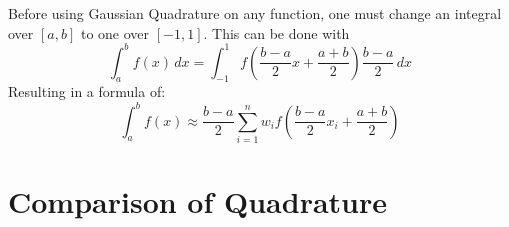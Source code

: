 \documentclass[12pt]{article}
\begin{document}
Before using Gaussian Quadrature on any function, one must change an integral over $[a,b]$ to one over $[-1,1]$. This can be done with
\begin{equation*}
	\int_{a}^{b} f(x) \,dx = \int_{-1}^{1}f \left(\frac{b-a}{2}x+\frac{a+b}{2}\right)\frac{b-a}{2} \,dx
\end{equation*}
Resulting in a formula of:
\begin{equation}
	\int_{a}^{b}f(x) \approx \frac{b-a}{2}\sum_{i=1}^{n}w_{i}f \left(\frac{b-a}{2}x_{i}+\frac{a+b}{2} \right)
\end{equation}

\section{Comparison of Quadrature}


% 


% 

\end{document}
